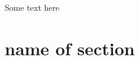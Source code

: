 \documentclass[11pt,a4paper]{article}
\begin{document}
    
Some text here

\section{name of section}
\end{document}
